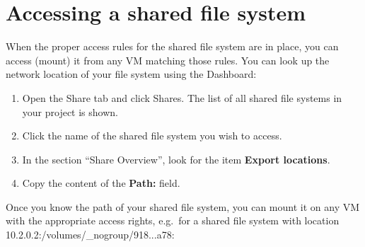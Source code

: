 \section*{Accessing a shared file system}\label{sec:access-shar-file}
When the proper access rules for the shared file system are in place, you can access (mount) it from any VM matching those rules.  You can look up the network location of your file system using the Dashboard:
\begin{enumerate}
\item Open the Share tab and click Shares.  The list of all shared file systems in your project is shown.
\item Click the name of the shared file system you wish to access.
\item In the section ``Share Overview'', look for the item \textbf{Export locations}.
\item Copy the content of the \textbf{Path:} field.
\end{enumerate}

Once you know the path of your shared file system, you can mount it on any VM with the appropriate access rights, e.g.\ for a shared file system with location 10.2.0.2:/volumes/\_nogroup/918...a78:

\begin{prompt}
\end{prompt}
